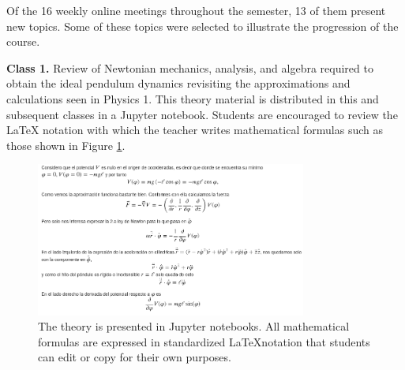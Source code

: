 

Of the 16 weekly online meetings throughout the semester, 13 of them present new topics. Some of these topics were selected to illustrate the progression of the course.








\textbf{Class 1.} Review of Newtonian mechanics, analysis, and algebra required to obtain the ideal pendulum dynamics revisiting the approximations and calculations seen in Physics 1. This theory material is distributed in this and subsequent classes in a Jupyter notebook. Students are encouraged to review the LaTeX notation with which the teacher writes mathematical formulas such as those shown in Figure \ref{fig:clase1pendulo}.

\begin{figure}[!ht]
\centering
\includegraphics[width=3.5in]{figuras/clase1péndulo.png}
\caption{The theory is presented in Jupyter notebooks. All mathematical formulas are expressed in standardized \LaTeX notation that students can edit or copy for their own purposes.}
\label{fig:clase1pendulo}
\end{figure}


